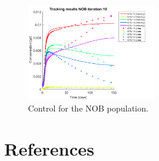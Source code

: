 \documentclass[3p,times]{elsarticle}
\begin{document}
\begin{figure}[h]
	\centering
	\includegraphics[width=0.5\textwidth]{Synthetic_data//lambda_=_e-2//191210_no_noise_2_NOB_iter_10_plot_1}
	\caption{Control for the NOB population.}
	\label{Control NOB no noise e2}
\end{figure}

\clearpage

\section{References}


\end{document}
